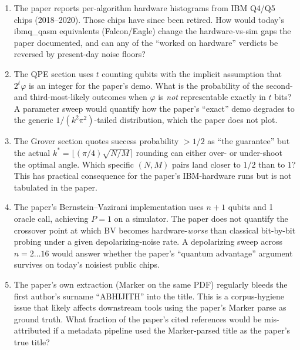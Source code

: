 \documentclass[11pt]{article}
\begin{document}
\begin{enumerate}
\item[Q1] The paper reports per-algorithm hardware histograms
from IBM Q4/Q5 chips (2018--2020). Those chips have since been
retired. How would today's ibmq\_qasm equivalents (Falcon/Eagle)
change the hardware-vs-sim gaps the paper documented, and can any
of the ``worked on hardware'' verdicts be reversed by
present-day noise floors?
\item[Q2] The QPE section uses $t$ counting qubits with the
implicit assumption that $2^t\varphi$ is an integer for the
paper's demo. What is the probability of the second- and
third-most-likely outcomes when $\varphi$ is \emph{not}
representable exactly in $t$ bits? A parameter sweep would
quantify how the paper's ``exact'' demo degrades to the generic
$1/(k^2\pi^2)$-tailed distribution, which the paper does not
plot.
\item[Q3] The Grover section quotes success probability $>1/2$
as ``the guarantee'' but the actual $k^*=\lfloor(\pi/4)\sqrt{N/M}\rceil$
rounding can either over- or under-shoot the optimal angle.
Which specific $(N,M)$ pairs land closer to $1/2$ than to $1$?
This has practical consequence for the paper's IBM-hardware
runs but is not tabulated in the paper.
\item[Q4] The paper's Bernstein--Vazirani implementation uses
$n{+}1$ qubits and 1 oracle call, achieving $P=1$ on a
simulator. The paper does not quantify the crossover point at
which BV becomes hardware-\emph{worse} than classical bit-by-bit
probing under a given depolarizing-noise rate. A depolarizing
sweep across $n=2\ldots16$ would answer whether the paper's
``quantum advantage'' argument survives on today's noisiest
public chips.
\item[Q5] The paper's own extraction (Marker on the same PDF)
regularly bleeds the first author's surname ``ABHIJITH'' into
the title. This is a corpus-hygiene issue that likely affects
downstream tools using the paper's Marker parse as ground
truth. What fraction of the paper's cited references would be
mis-attributed if a metadata pipeline used the Marker-parsed
title as the paper's true title?
\end{enumerate}
\end{document}
